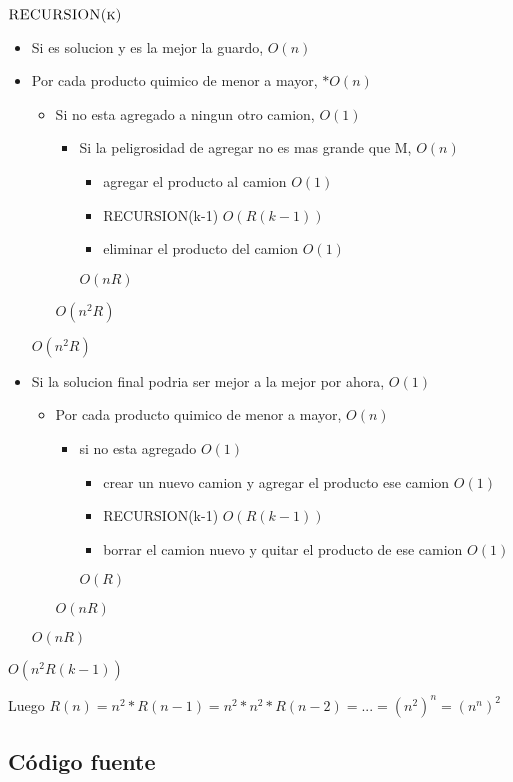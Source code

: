 $\textnormal{\scshape RECURSION(k)}$
\begin{itemize}
\item Si es solucion y es la mejor la guardo,						$O(n)$
\item Por cada producto quimico de menor a mayor, 						$*O(n)$
	\begin{itemize}
	\item Si no esta agregado a ningun otro camion,						$O(1)$			
		\begin{itemize}
		\item Si la peligrosidad de agregar no es mas grande que M,		$O(n)$
			\begin{itemize}
			\item agregar el producto al camion							$O(1)$
			\item RECURSION(k-1)											$O(R(k-1))$
			\item eliminar el producto del camion							$O(1)$
			\end{itemize}													$O(nR)$
		\end{itemize}													$O(n^2R)$
	\end{itemize}															$O(n^2R)$
\item Si la solucion final podria ser mejor a la mejor por ahora,				$O(1)$
	\begin{itemize}
	\item Por cada producto quimico de menor a mayor,								$O(n)$
		\begin{itemize}
		\item si no esta agregado													$O(1)$
			\begin{itemize}
			\item crear un nuevo camion y agregar el producto ese camion			$O(1)$
			\item RECURSION(k-1)													$O(R(k-1))$
			\item borrar el camion nuevo y quitar el producto de ese camion		$O(1)$
			\end{itemize}						$O(R)$
		\end{itemize}						$O(nR)$
	\end{itemize}						$O(nR)$
\end{itemize}	$O(n^2R(k-1))$





Luego $R(n) = n^2*R(n-1) = n^2*n^2*R(n-2) = ... = (n^2)^n = (n^n)^2$


\subsection{C\'odigo fuente}


